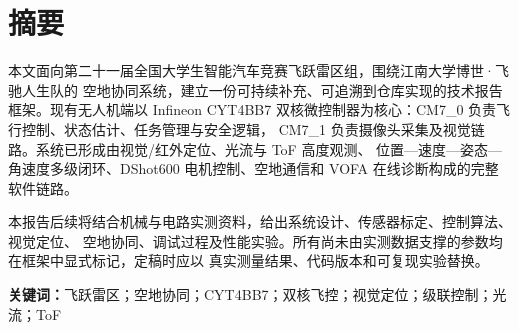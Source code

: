 \chapter*{摘要}

本文面向第二十一届全国大学生智能汽车竞赛飞跃雷区组，围绕江南大学博世·飞驰人生队的
空地协同系统，建立一份可持续补充、可追溯到仓库实现的技术报告框架。现有无人机端以
Infineon CYT4BB7 双核微控制器为核心：CM7\_0 负责飞行控制、状态估计、任务管理与安全逻辑，
CM7\_1 负责摄像头采集及视觉链路。系统已形成由视觉/红外定位、光流与 ToF 高度观测、
位置—速度—姿态—角速度多级闭环、DShot600 电机控制、空地通信和 VOFA 在线诊断构成的完整软件链路。

本报告后续将结合机械与电路实测资料，给出系统设计、传感器标定、控制算法、视觉定位、
空地协同、调试过程及性能实验。所有尚未由实测数据支撑的参数均在框架中显式标记，定稿时应以
真实测量结果、代码版本和可复现实验替换。


\noindent\textbf{关键词：}飞跃雷区；空地协同；CYT4BB7；双核飞控；视觉定位；级联控制；光流；ToF
